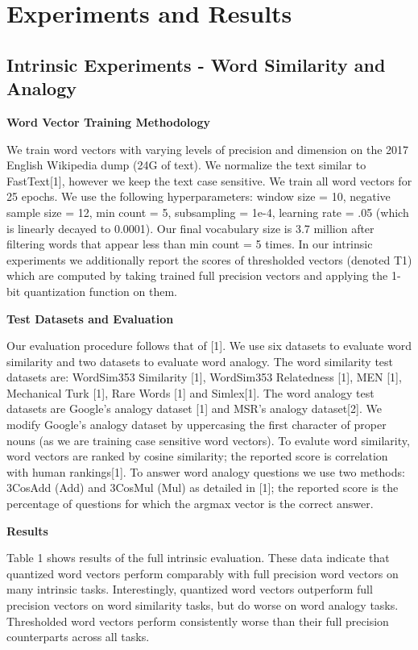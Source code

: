 \documentclass{article} %
\begin{document}
\section{Experiments and Results}
\subsection{Intrinsic Experiments - Word Similarity and Analogy}

\textbf{Word Vector Training Methodology}

We train word vectors with varying levels of precision and dimension
on the 2017 English Wikipedia dump (24G of text). We normalize the
text similar to FastText[1], however we keep the text case
sensitive. We train all word vectors for 25 epochs. We use the
following hyperparameters: window size = 10, negative sample size =
12, min count = 5, subsampling = 1e-4, learning rate = .05 (which is
linearly decayed to 0.0001). Our final vocabulary size is 3.7 million
after filtering words that appear less than min count = 5 times. In
our intrinsic experiments we additionally report the scores of
thresholded vectors (denoted T1) which are computed by taking
trained full precision vectors and applying the 1-bit quantization function
on them.

\textbf{Test Datasets and Evaluation}

Our evaluation procedure follows that of [1]. We use six datasets to
evaluate word similarity and two datasets to evaluate word
analogy. The word similarity test datasets are: WordSim353 Similarity
[1], WordSim353 Relatedness [1], MEN [1], Mechanical Turk [1], Rare
Words [1] and Simlex[1]. The word analogy test datasets are Google's
analogy dataset [1] and MSR's analogy dataset[2]. We modify Google's
analogy dataset by uppercasing the first character of proper nouns (as
we are training case sensitive word vectors). To evalute word
similarity, word vectors are ranked by cosine similarity; the reported
score is correlation with human rankings[1]. To answer word analogy
questions we use two methods: 3CosAdd (Add) and 3CosMul (Mul) as
detailed in [1]; the reported score is the percentage of questions for
which the argmax vector is the correct answer.

\textbf{Results}

Table 1 shows results of the full intrinsic evaluation. These data
indicate that quantized word vectors perform comparably with full
precision word vectors on many intrinsic tasks. Interestingly,
quantized word vectors outperform full precision vectors on word
similarity tasks, but do worse on word analogy tasks. Thresholded word
vectors perform consistently worse than their full precision
counterparts across all tasks.
\end{document}
